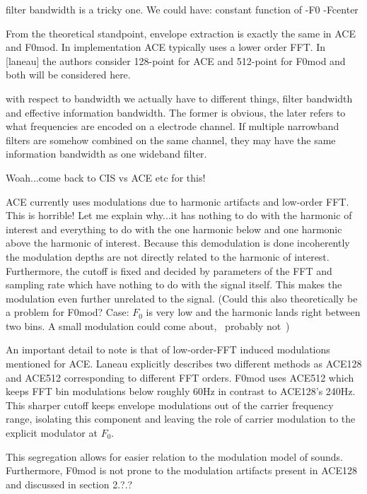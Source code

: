 \documentclass [11pt, proquest] {uwthesis}[2015/03/03]
\begin{document}
filter bandwidth is a tricky one.  We could have:
constant
function of
-F0
-Fcenter

From the theoretical standpoint, envelope extraction is exactly the same in ACE and F0mod.  In implementation ACE typically uses a lower order FFT.  In [laneau] the authors consider 128-point for ACE and 512-point for F0mod and both will be considered here.



		with respect to bandwidth we actually have to different things, filter bandwidth and effective information bandwidth.  The former is obvious, the later refers to what frequencies are encoded on a electrode channel.  If multiple narrowband filters are somehow combined on the same channel, they may have the same information bandwidth as one wideband filter.





Woah...come back to CIS vs ACE etc for this!

ACE currently uses modulations due to harmonic artifacts and low-order FFT.  This is horrible!  Let me explain why...it has nothing to do with the harmonic of interest and everything to do with the one harmonic below and one harmonic above the harmonic of interest.  Because this demodulation is done incoherently the modulation depths are not directly related to the harmonic of interest.  Furthermore, the cutoff is fixed and decided by parameters of the FFT and sampling rate which have nothing to do with the signal itself.  This makes the modulation even further unrelated to the signal.  (Could this also theoretically be a problem for F0mod?  Case: $F_0$ is very low and the harmonic lands right between two bins.  A small modulation could come about, ~probably not~)

An important detail to note is that of low-order-FFT induced modulations mentioned for ACE.  Laneau explicitly describes two different methods as ACE128 and ACE512 corresponding to different FFT orders.  F0mod uses ACE512 which keeps FFT bin modulations below roughly 60Hz in contrast to ACE128's 240Hz.  This sharper cutoff keeps envelope modulations out of the carrier frequency range, isolating this component and leaving the role of carrier modulation to the explicit modulator at $F_0$.

This segregation allows for easier relation to the modulation model of sounds.  Furthermore, F0mod is not prone to the modulation artifacts present in ACE128 and discussed in section 2.?.?
\end{document}
